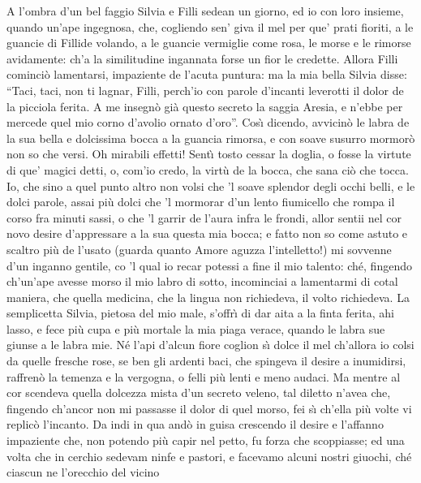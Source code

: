 \documentclass{book}
\begin{document}
	\4 A l'ombra d'un bel faggio Silvia e Filli
	sedean un giorno, ed io con loro insieme,
	quando un'ape ingegnosa, che, cogliendo
	sen' giva il mel per que' prati fioriti,
	a le guancie di Fillide volando,
	a le guancie vermiglie come rosa,
	le morse e le rimorse avidamente:
	ch'a la similitudine ingannata
	forse un fior le credette. Allora Filli
	cominci\`o lamentarsi, impaziente
	de l'acuta puntura:
	ma la mia bella Silvia disse: ``Taci,
	taci, non ti lagnar, Filli, perch'io
	con parole d'incanti leverotti
	il dolor de la picciola ferita.
	A me insegn\`o gi\`a questo secreto
	la saggia Aresia, e n'ebbe per mercede
	quel mio corno d'avolio ornato d'oro''.
	Cos\`{\i} dicendo, avvicin\`o le labra
	de la sua bella e dolcissima bocca
	a la guancia rimorsa, e con soave
	susurro mormor\`o non so che versi.
	Oh mirabili effetti! Sent\`{\i} tosto
	cessar la doglia, o fosse la virtute
	di que' magici detti, o, com'io credo,
	la virt\`u de la bocca,
	che sana ci\`o che tocca.
	Io, che sino a quel punto altro non volsi
	che 'l soave splendor degli occhi belli,
	e le dolci parole, assai pi\`u dolci
	che 'l mormorar d'un lento fiumicello
	che rompa il corso fra minuti sassi,
	o che 'l garrir de l'aura infra le frondi,
	allor sentii nel cor novo desire
	d'appressare a la sua questa mia bocca;
	e fatto non so come astuto e scaltro
	pi\`u de l'usato (guarda quanto Amore
	aguzza l'intelletto!) mi sovvenne
	d'un inganno gentile, co 'l qual io
	recar potessi a fine il mio talento:
	ch\'e, fingendo ch'un'ape avesse morso
	il mio labro di sotto, incominciai
	a lamentarmi di cotal maniera,
	che quella medicina, che la lingua
	non richiedeva, il volto richiedeva.
	La semplicetta Silvia,
	pietosa del mio male,
	s'offr\`{\i} di dar aita
	a la finta ferita, ahi lasso, e fece
	pi\`u cupa e pi\`u mortale
	la mia piaga verace,
	quando le labra sue
	giunse a le labra mie.
	N\'e l'api d'alcun fiore
	coglion s\`{\i} dolce il mel ch'allora io colsi
	da quelle fresche rose,
	se ben gli ardenti baci,
	che spingeva il desire a inumidirsi,
	raffren\`o la temenza
	e la vergogna, o felli
	pi\`u lenti e meno audaci.
	Ma mentre al cor scendeva
	quella dolcezza mista
	d'un secreto veleno,
	tal diletto n'avea
	che, fingendo ch'ancor non mi passasse
	il dolor di quel morso,
	fei s\`{\i} ch'ella pi\`u volte
	vi replic\`o l'incanto.
	Da indi in qua and\`o in guisa crescendo
	il desire e l'affanno impaziente
	che, non potendo pi\`u capir nel petto,
	fu forza che scoppiasse; ed una volta
	che in cerchio sedevam ninfe e pastori,
	e facevamo alcuni nostri giuochi,
	ch\'e ciascun ne l'orecchio del vicino
\end{document}
